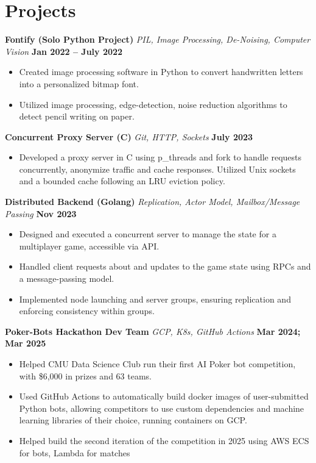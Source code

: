 \documentclass[fontsize=12pt]{scrartcl}
\begin{document}
\vspace{-12pt} %
\section{Projects}
\textbf{Fontify (Solo Python Project)} {\small\textit{PIL, Image Processing, De-Noising, Computer Vision}} \hfill \textbf{Jan 2022 -- July 2022}
\begin{itemize}
    \item Created image processing software in Python to convert handwritten letters into a personalized bitmap font.
    \item Utilized image processing, edge-detection, noise reduction algorithms to detect pencil writing on paper.
\end{itemize}

\textbf{Concurrent Proxy Server (C)} {\small\textit{Git, HTTP, Sockets}} \hfill \textbf{July 2023}
\begin{itemize}
    \item Developed a proxy server in C using p\_threads and fork to handle requests concurrently, anonymize traffic and cache responses. Utilized Unix sockets and a bounded cache following an LRU eviction policy.
\end{itemize}

\textbf{Distributed Backend (Golang)} {\small\textit{Replication, Actor Model, Mailbox/Message Passing}} \hfill \textbf{Nov 2023}
\begin{itemize}
    \item Designed and executed a concurrent server to manage the state for a multiplayer game, accessible via API\@.
    \item Handled client requests about and updates to the game state using RPCs and a message-passing model.
    \item Implemented node launching and server groups, ensuring replication and enforcing consistency within groups.
\end{itemize}

\textbf{Poker-Bots Hackathon Dev Team} {\small\textit{GCP, K8s, GitHub Actions}} \hfill \textbf{Mar 2024; Mar 2025}
\begin{itemize}
    \item Helped CMU Data Science Club run their first AI Poker bot competition, with \$6,000 in prizes and 63 teams.
    \item Used GitHub Actions to automatically build docker images of user-submitted Python bots, allowing competitors to use custom dependencies and machine learning libraries of their choice, running containers on GCP\@.
    \item Helped build the second iteration of the competition in 2025 using AWS ECS for bots, Lambda for matches
\end{itemize}
\end{document}
